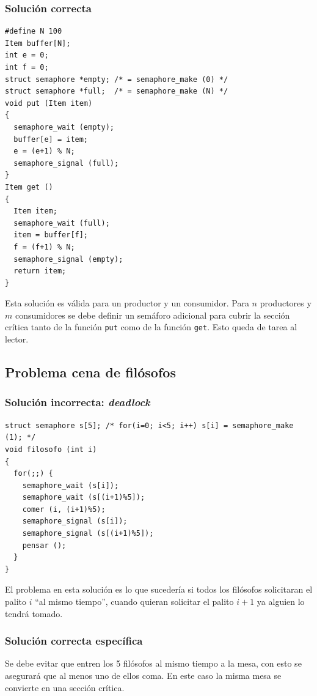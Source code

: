\subsubsection{Solución correcta}

\begin{lstlisting}
#define N 100
Item buffer[N];
int e = 0;
int f = 0;
struct semaphore *empty; /* = semaphore_make (0) */
struct semaphore *full;  /* = semaphore_make (N) */
void put (Item item)
{
  semaphore_wait (empty);
  buffer[e] = item;
  e = (e+1) % N;
  semaphore_signal (full);
}
Item get ()
{
  Item item;
  semaphore_wait (full);
  item = buffer[f];
  f = (f+1) % N;
  semaphore_signal (empty);
  return item;
}
\end{lstlisting}

Esta solución es válida para un productor y un consumidor. Para $n$ productores
y $m$ consumidores se debe definir un semáforo adicional para cubrir la sección
crítica tanto de la función \texttt{put} como de la función \texttt{get}. Esto
queda de tarea al lector.

\subsection{Problema cena de filósofos}

\subsubsection{Solución incorrecta: \emph{deadlock}}

\begin{lstlisting}
struct semaphore s[5]; /* for(i=0; i<5; i++) s[i] = semaphore_make (1); */
void filosofo (int i)
{
  for(;;) {
    semaphore_wait (s[i]);
    semaphore_wait (s[(i+1)%5]);
    comer (i, (i+1)%5);
    semaphore_signal (s[i]);
    semaphore_signal (s[(i+1)%5]);
    pensar ();
  }
}
\end{lstlisting}

El problema en esta solución es lo que sucedería si todos los filósofos
solicitaran el palito $i$ ``al mismo tiempo'', cuando quieran solicitar el
palito $i+1$ ya alguien lo tendrá tomado.

\subsubsection{Solución correcta específica}
Se debe evitar que entren los 5 filósofos al mismo tiempo a la mesa, con esto se
asegurará que al menos uno de ellos coma. En este caso la misma mesa se
convierte en una sección crítica.

